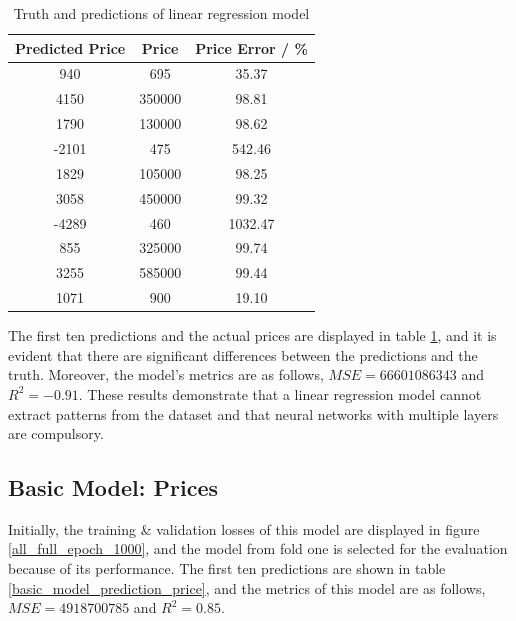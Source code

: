 \documentclass[12pt,twoside]{report}
\begin{document}
\begin{table}[H]
	\centering
	\caption{Truth and predictions of linear regression model}
	\label{linear_regression_predictions}
	\begin{tabular}{| c | c | c |}
		\hline
		Predicted Price & Price & Price Error  / \%\\ 
		\hline
		940 & 695 & 35.37 \\
		\hline
		4150 & 350000 & 98.81 \\
		\hline
		1790 & 130000 & 98.62 \\
		\hline
		-2101 & 475 & 542.46 \\
		\hline
		1829 & 105000 & 98.25 \\
		\hline
		3058 & 450000 & 99.32 \\
		\hline
		-4289 & 460 & 1032.47 \\
		\hline
		855 & 325000 & 99.74 \\
		\hline
		3255 & 585000 & 99.44 \\
		\hline
		1071 & 900 & 19.10 \\
		\hline
	\end{tabular}
\end{table}

The first ten predictions and the actual prices are displayed in table \ref{linear_regression_predictions}, and it is evident that there are significant differences between the predictions and the truth. Moreover, the model's metrics are as follows, $MSE = 66601086343$ and $R^2 = -0.91$. These results demonstrate that a linear regression model cannot extract patterns from the dataset and that neural networks with multiple layers are compulsory.

\subsection{Basic Model: Prices}
Initially, the training \& validation losses of this model are displayed in figure \ref{all_full_epoch_1000}, and the model from fold one is selected for the evaluation because of its performance. The first ten predictions are shown in table \ref{basic_model_prediction_price}, and the metrics of this model are as follows, $MSE = 4918700785$ and $R^2 = 0.85$. 
\end{document}
